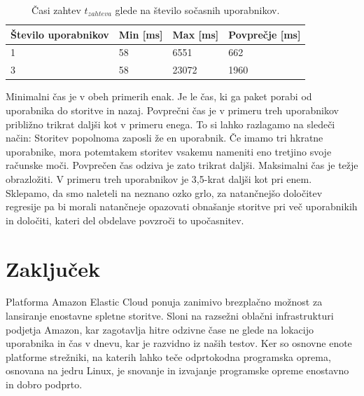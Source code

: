 \begin{table}[ht]
 \caption{Časi zahtev $t_{zahteva}$ glede na število sočasnih uporabnikov.}
 \label{1_tab_multi_user}
 \centering
\begin{tabular}{ |p{2.5cm}||p{2cm}|p{2cm}|p{2cm}| }
 \hline
 Število uporabnikov & Min [ms] & Max [ms] & Povprečje [ms] \\
 \hline
 1 & 58 &  6551 &  662 \\
 3 & 58 & 23072 & 1960 \\
 \hline
\end{tabular}
\end{table}

Minimalni čas je v obeh primerih enak.
Je le čas, ki ga paket porabi od uporabnika do storitve in nazaj.
Povprečni čas je v primeru treh uporabnikov približno trikrat daljši kot v primeru enega.
To si lahko razlagamo na sledeči način:
Storitev popolnoma zaposli že en uporabnik.
Če imamo tri hkratne uporabnike, mora potemtakem storitev vsakemu nameniti eno tretjino svoje računske moči.
Povprečen čas odziva je zato trikrat daljši.
Maksimalni čas je težje obrazložiti.
V primeru treh uporabnikov je 3,5-krat daljši kot pri enem.
Sklepamo, da smo naleteli na neznano ozko grlo, za natančnejšo določitev regresije pa bi morali natančneje opazovati obnašanje storitve pri več uporabnikih in določiti, kateri del obdelave povzroči to upočasnitev.

%

\section{Zaključek}

Platforma Amazon Elastic Cloud ponuja zanimivo brezplačno možnost za lansiranje enostavne spletne storitve.
Sloni na razsežni oblačni infrastrukturi podjetja Amazon, kar zagotavlja hitre odzivne čase ne glede na lokacijo uporabnika in čas v dnevu, kar je razvidno iz naših testov.
Ker so osnovne enote platforme strežniki, na katerih lahko teče odprtokodna programska oprema, osnovana na jedru Linux, je snovanje in izvajanje programske opreme enostavno in dobro podprto.

